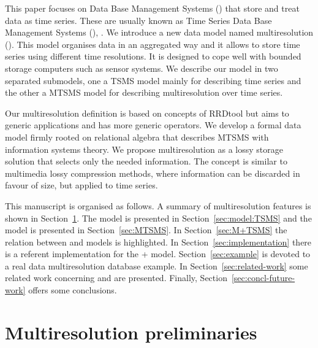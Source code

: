 
This paper focuses on Data Base Management Systems \linebreak[4]
() that store and treat data as time series. These are
usually known as Time Series Data Base Management Systems
(), \cite{dreyer94,last01}.  We introduce a new data model
named multiresolution  (). This model organises
data in an aggregated way and it allows to store time series using
different time resolutions. It is designed to cope well with bounded
storage computers such as sensor systems.  We describe our model in
two separated submodels, one a TSMS model mainly for describing time
series and the other a MTSMS model for describing multiresolution over
time series.


Our multiresolution definition is based on concepts of RRDtool but
aims to generic applications and has more generic operators. We
develop a formal data model firmly rooted on relational algebra that
describes MTSMS with information systems theory.  We propose
multiresolution as a lossy storage solution that selects only the
needed information. The concept is similar to multimedia lossy
compression methods, where information can be discarded in favour of
size, but applied to time series.




This manuscript is organised as follows.  A summary of multiresolution
features is shown in Section~\ref{sec:features}.  The 
model is presented in Section~\ref{sec:model:TSMS} and the
 model is presented in Section~\ref{sec:MTSMS}. In
Section~\ref{sec:M+TSMS} the relation between  and
 models is highlighted.  In
Section~\ref{sec:implementation} there is a referent implementation
for the + model.  Section~\ref{sec:example} is
devoted to a real data multiresolution database example.
In Section~\ref{sec:related-work} some related work concerning
 and  are presented. Finally,
Section~\ref{sec:concl-future-work} offers some conclusions.




\section{Multiresolution preliminaries}
\label{sec:features}

